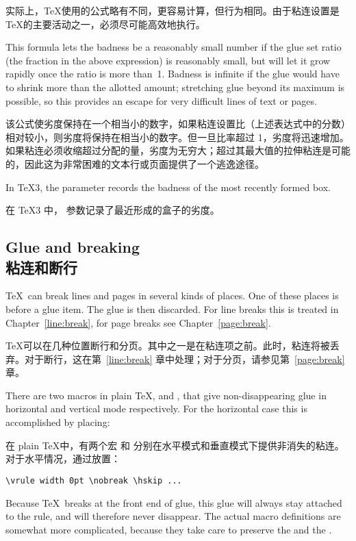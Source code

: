实际上，\TeX 使用的公式略有不同，更容易计算，但行为相同。由于粘连设置是 \TeX 的主要活动之一，必须尽可能高效地执行。

This formula lets the badness be a reasonably small number
if the glue set ratio (the fraction in the above expression)
is reasonably small, but will let it grow rapidly once
the ratio is more than~1. Badness is infinite if the
glue would have to shrink more than the allotted amount;
stretching glue beyond its maximum is possible, so this
provides an  escape for very difficult lines of text or pages.

该公式使劣度保持在一个相当小的数字，如果粘连设置比（上述表达式中的分数）相对较小，则劣度将保持在相当小的数字。但一旦比率超过 1，劣度将迅速增加。如果粘连必须收缩超过分配的量，劣度为无穷大；超过其最大值的拉伸粘连是可能的，因此这为非常困难的文本行或页面提供了一个逃逸途径。

In \TeX3, the  parameter records the badness
of the most recently formed box.

在 \TeX3 中， 参数记录了最近形成的盒子的劣度。


\subsection{Glue and breaking\\粘连和断行}

\TeX\ can break lines and pages in several kinds of places.
One of these places is before a glue item. 
The glue is then discarded. For line breaks this is treated
in Chapter~\ref{line:break}, 
for page breaks see Chapter~\ref{page:break}.

\TeX 可以在几种位置断行和分页。其中之一是在粘连项之前。此时，粘连将被丢弃。对于断行，这在第~\ref{line:break} 章中处理；对于分页，请参见第~\ref{page:break} 章。

There are two macros in plain \TeX,  and ,
that give non-disappearing glue in horizontal and
vertical mode respectively. For the horizontal case this is
accomplished by
placing:

在 plain \TeX 中，有两个宏  和  分别在水平模式和垂直模式下提供非消失的粘连。对于水平情况，通过放置：
\begin{verbatim}
\vrule width 0pt \nobreak \hskip ...
\end{verbatim}
Because \TeX\ breaks at the front end of glue,
this glue will always stay attached to the rule,
and will therefore never disappear.
The actual macro definitions are somewhat more complicated,
because they take care to preserve the  and the
.

